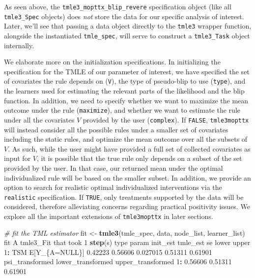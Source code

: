 \documentclass[12pt, krantz2,]{krantz}
\newenvironment{Shaded}{\begin{snugshade}}{\end{snugshade}}
\newcommand{\CommentTok}[1]{\textcolor[rgb]{0.37,0.37,0.37}{\textit{#1}}}
\newcommand{\DecValTok}[1]{\textcolor[rgb]{0.06,0.06,0.06}{#1}}
\newcommand{\FloatTok}[1]{\textcolor[rgb]{0.06,0.06,0.06}{#1}}
\newcommand{\KeywordTok}[1]{\textcolor[rgb]{0.27,0.27,0.27}{\textbf{#1}}}
\newcommand{\NormalTok}[1]{#1}
\newcommand{\OperatorTok}[1]{\textcolor[rgb]{0.43,0.43,0.43}{\textbf{#1}}}
\newcommand{\OtherTok}[1]{\textcolor[rgb]{0.37,0.37,0.37}{#1}}
\newcommand{\StringTok}[1]{\textcolor[rgb]{0.5,0.5,0.5}{#1}}
\theoremstyle{definition}
\theoremstyle{definition}
\theoremstyle{definition}
\newcommand{\1}{\mathbbm{1}}
\begin{document}
As seen above, the \texttt{tmle3\_mopttx\_blip\_revere} specification object
(like all \texttt{tmle3\_Spec} objects) does \emph{not} store the data for our
specific analysis of interest. Later,
we'll see that passing a data object directly to the \texttt{tmle3} wrapper function,
alongside the instantiated \texttt{tmle\_spec}, will serve to construct a \texttt{tmle3\_Task}
object internally.

We elaborate more on the initialization specifications. In initializing the
specification for the TMLE of our parameter of interest, we have specified the
set of covariates the rule depends on (\texttt{V}), the type of pseudo-blip to use
(\texttt{type}), and the learners used for estimating the relevant parts of the
likelihood and the blip function. In addition, we need to specify whether we
want to maximize the mean outcome under the rule (\texttt{maximize}), and whether we
want to estimate the rule under all the covariates \(V\) provided by the user
(\texttt{complex}). If \texttt{FALSE}, \texttt{tmle3mopttx} will instead consider all the possible
rules under a smaller set of covariates including the static rules, and optimize
the mean outcome over all the subsets of \(V\). As such, while the user might have
provided a full set of collected covariates as input for \(V\), it is possible
that the true rule only depends on a subset of the set provided by the user. In
that case, our returned mean under the optimal individualized rule will be based
on the smaller subset. In addition, we provide an option to search for realistic
optimal individualized interventions via the \texttt{realistic} specification. If
\texttt{TRUE}, only treatments supported by the data will be considered, therefore
alleviating concerns regarding practical positivity issues. We explore all the
important extensions of \texttt{tmle3mopttx} in later sections.

\begin{Shaded}
\begin{Highlighting}[]
\CommentTok{# fit the TML estimator}
\NormalTok{fit <-}\StringTok{ }\KeywordTok{tmle3}\NormalTok{(tmle_spec, data, node_list, learner_list)}
\NormalTok{fit}
\NormalTok{A tmle3_Fit that took }\DecValTok{1} \KeywordTok{step}\NormalTok{(s)}
\NormalTok{   type         param init_est tmle_est       se   lower   upper}
\DecValTok{1}\OperatorTok{:}\StringTok{  }\NormalTok{TSM E[Y_\{A=}\OtherTok{NULL}\NormalTok{\}]  }\FloatTok{0.42223}  \FloatTok{0.56606} \FloatTok{0.027015} \FloatTok{0.51311} \FloatTok{0.61901}
\NormalTok{   psi_transformed lower_transformed upper_transformed}
\DecValTok{1}\OperatorTok{:}\StringTok{         }\FloatTok{0.56606}           \FloatTok{0.51311}           \FloatTok{0.61901}
\end{Highlighting}
\end{Shaded}
\end{document}
